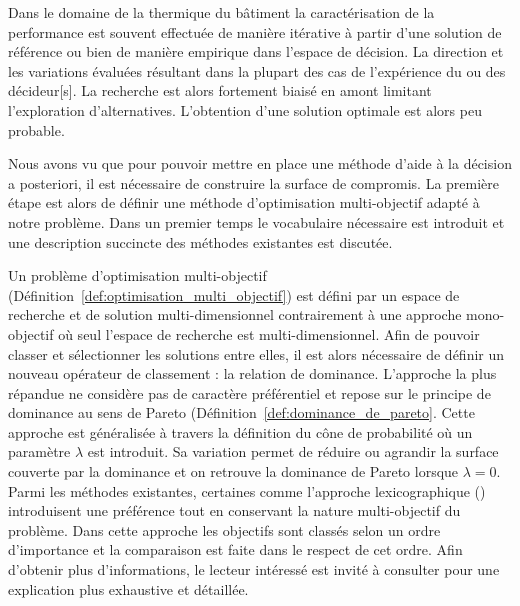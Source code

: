 
Dans le domaine de la thermique du bâtiment la caractérisation
de la performance est souvent effectuée de manière itérative à partir d’une solution
de référence ou bien de manière empirique dans l’espace de décision. La direction et
les variations évaluées résultant dans la plupart des cas de l’expérience du ou des
décideur[s]. La recherche est alors fortement biaisé en amont limitant l’exploration
d’alternatives. L’obtention d’une solution optimale est alors peu probable.

Nous avons vu que pour pouvoir mettre en place une méthode d’aide à la décision a posteriori, il
est nécessaire de construire la surface de compromis. La première étape est alors
de définir une méthode d’optimisation multi-objectif adapté à notre problème.
Dans un premier temps le vocabulaire nécessaire est introduit et une
description succincte des méthodes existantes est discutée.


Un problème d’optimisation multi-objectif (Définition~\ref{def:optimisation_multi_objectif})
est défini par un espace de recherche et de solution multi-dimensionnel contrairement à
une approche mono-objectif où seul l’espace de recherche est multi-dimensionnel.
Afin de pouvoir classer et sélectionner les solutions entre elles, il est alors nécessaire de définir un
nouveau opérateur de classement : la relation de dominance.
L’approche la plus répandue ne considère pas de caractère préférentiel et repose sur
le principe de dominance au sens de Pareto (Définition~\ref{def:dominance_de_pareto}.
Cette approche est généralisée à travers la définition du cône de probabilité où
un paramètre $\lambda$ est introduit. Sa variation permet de réduire ou agrandir
la surface couverte par la dominance et on retrouve la dominance de Pareto lorsque $\lambda = 0$.
Parmi les méthodes existantes, certaines comme l’approche lexicographique ()
introduisent une préférence tout en conservant la nature multi-objectif du problème.
Dans cette approche les objectifs sont classés selon un ordre d’importance et la comparaison est
faite dans le respect de cet ordre.
Afin d’obtenir plus d’informations, le lecteur intéressé est invité à consulter \cite{Collette2002}
pour une explication plus exhaustive et détaillée.

